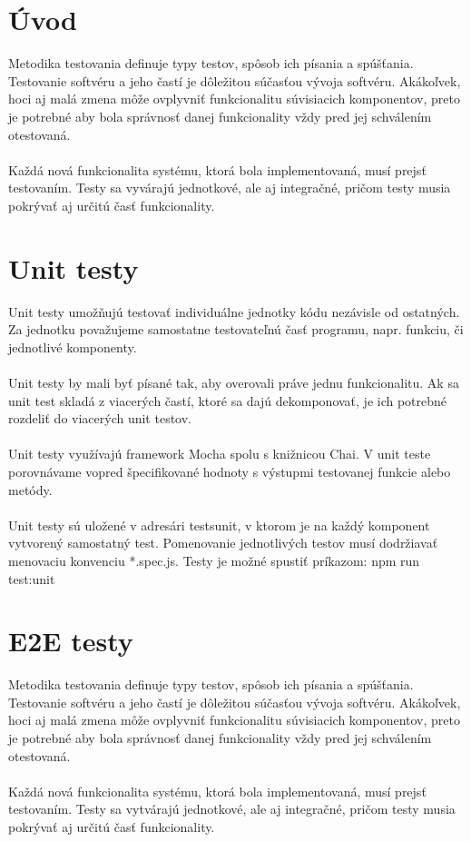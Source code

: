 \documentclass{article}
\begin{document}
    

    \section*{Úvod}

        \textnormal{%
        Metodika testovania definuje typy testov, spôsob ich písania a spúšťania. Testovanie softvéru a jeho častí je dôležitou súčasťou vývoja softvéru. Akákoľvek, hoci aj malá zmena môže ovplyvniť funkcionalitu súvisiacich komponentov, preto je potrebné aby bola správnosť danej funkcionality vždy pred jej schválením otestovaná. \\\\
Každá nová funkcionalita systému, ktorá bola implementovaná, musí prejsť testovaním. Testy sa vyvárajú jednotkové, ale aj integračné, pričom testy musia pokrývať aj určitú časť funkcionality.
        }
		\section*{Unit testy}

        \textnormal{%
     Unit testy umožňujú testovať individuálne jednotky kódu nezávisle od ostatných. Za jednotku považujeme samostatne testovateľnú časť programu, napr. funkciu, či jednotlivé komponenty. \\\\
Unit testy by mali byť písané tak, aby overovali práve jednu funkcionalitu. Ak sa unit test skladá z viacerých častí, ktoré sa dajú dekomponovať, je ich potrebné rozdeliť do viacerých unit testov. \\\\
Unit testy využívajú framework Mocha spolu s knižnicou Chai. V unit teste porovnávame vopred špecifikované hodnoty s výstupmi testovanej funkcie alebo metódy. \\\\
Unit testy sú uložené v adresári \/tests\/unit, v ktorom je na každý komponent vytvorený samostatný test. Pomenovanie jednotlivých testov musí dodržiavať menovaciu konvenciu *.spec.js. 
Testy je možné spustiť príkazom:
npm run test:unit
        }
				
				   \section*{E2E testy}

        \textnormal{%
        Metodika testovania definuje typy testov, spôsob ich písania a spúšťania. Testovanie softvéru a jeho častí je dôležitou súčasťou vývoja softvéru. Akákoľvek, hoci aj malá zmena môže ovplyvniť funkcionalitu súvisiacich komponentov, preto je potrebné aby bola správnosť danej funkcionality vždy pred jej schválením otestovaná. \\\\
Každá nová funkcionalita systému, ktorá bola implementovaná, musí prejsť testovaním. Testy sa vytvárajú jednotkové, ale aj integračné, pričom testy musia pokrývať aj určitú časť funkcionality.
        }
				
\end{document}
